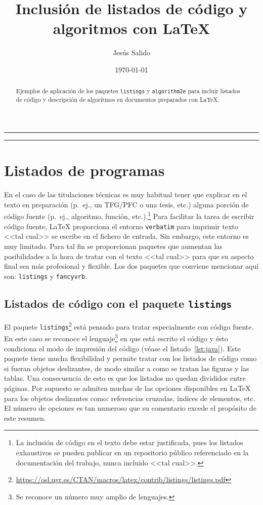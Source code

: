 \documentclass[11pt,a4paper]{article}
\author{Jesús Salido}
\title{Inclusión de listados de código y algoritmos con \LaTeX{}}
\date{\today}
\begin{document}
\maketitle

\begin{abstract}
	Ejemplos de aplicación de los paquetes \texttt{listings} y \texttt{algorithm2e} para incluir listados de código y descripción de algoritmos en documentos preparados con  \LaTeX{}.
\end{abstract}

\renewcommand{\lstlistlistingname}{Índice de listados} %
\renewcommand{\lstlistingname}{Listado} %

\hrule
\tableofcontents
\lstlistoflistings
\listofalgorithms
\bigskip
\hrule

\section{Listados de programas}
En el caso de las titulaciones técnicas es muy habitual tener que explicar en el texto en preparación (p.~ej., un TFG/PFC o una tesis, etc.) alguna porción de código fuente (p.~ej., algoritmo, función, etc.).\footnote{La inclusión de código en el texto debe estar justificada, pues los listados exhaustivos se pueden publicar en un repositorio público referenciado en la documentación del trabajo, nunca incluido <<tal cual>>.} Para facilitar la tarea de escribir código fuente, \LaTeX{} proporciona el entorno \texttt{verbatim} para imprimir texto <<tal cual>> se escribe en el fichero de entrada. Sin embargo, este entorno es muy limitado. Para tal fin se proporcionan paquetes que aumentan las posibilidades a la hora de tratar con el texto <<tal cual>> para que su aspecto final sea más profesional y flexible. Los dos paquetes que conviene mencionar aquí son: \texttt{listings} y \texttt{fancyvrb}.


\subsection{Listados de código con el paquete \texttt{listings}}
El paquete \texttt{listings}\footnote{\url{https://osl.ugr.es/CTAN/macros/latex/contrib/listings/listings.pdf}} está pensado para tratar especialmente con código fuente. En este caso se reconoce el lenguaje\footnote{Se reconoce un número muy amplio de lenguajes.} en que está escrito el código y ésto condiciona el modo de impresión del código (véase el listado~\ref{lst:java}). Este paquete tiene mucha flexibilidad y permite tratar con los listados de código como si fueran objetos deslizantes, de modo similar a como se tratan las figuras y las tablas. Una consecuencia de esto es que los listados no quedan divididos entre páginas. Por supuesto se admiten muchas de las opciones disponibles en \LaTeX{} para los objetos deslizantes como: referencias cruzadas, índices de elementos, etc. El número de opciones es tan numeroso que su comentario excede el propósito de este resumen.
\end{document}
